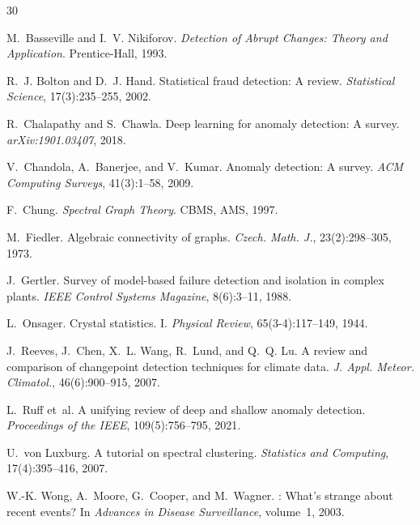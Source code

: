 \documentclass[11pt,a4paper]{article}
\begin{document}

\begin{thebibliography}{30}

M.~Basseville and I.~V. Nikiforov.
\newblock \emph{Detection of Abrupt Changes: Theory and Application}.
\newblock Prentice-Hall, 1993.

R.~J. Bolton and D.~J. Hand.
\newblock Statistical fraud detection: A review.
\newblock \emph{Statistical Science}, 17(3):235--255, 2002.

R.~Chalapathy and S.~Chawla.
\newblock Deep learning for anomaly detection: A survey.
\newblock \emph{arXiv:1901.03407}, 2018.

V.~Chandola, A.~Banerjee, and V.~Kumar.
\newblock Anomaly detection: A survey.
\newblock \emph{ACM Computing Surveys}, 41(3):1--58, 2009.

F.~Chung.
\newblock \emph{Spectral Graph Theory}.
\newblock CBMS, AMS, 1997.

M.~Fiedler.
\newblock Algebraic connectivity of graphs.
\newblock \emph{Czech. Math. J.}, 23(2):298--305, 1973.

J.~Gertler.
\newblock Survey of model-based failure detection and isolation in complex plants.
\newblock \emph{IEEE Control Systems Magazine}, 8(6):3--11, 1988.

L.~Onsager.
\newblock Crystal statistics. {I}.
\newblock \emph{Physical Review}, 65(3-4):117--149, 1944.

J.~Reeves, J.~Chen, X.~L. Wang, R.~Lund, and Q.~Q. Lu.
\newblock A review and comparison of changepoint detection techniques for climate data.
\newblock \emph{J. Appl. Meteor. Climatol.}, 46(6):900--915, 2007.

L.~Ruff et~al.
\newblock A unifying review of deep and shallow anomaly detection.
\newblock \emph{Proceedings of the IEEE}, 109(5):756--795, 2021.

U.~von Luxburg.
\newblock A tutorial on spectral clustering.
\newblock \emph{Statistics and Computing}, 17(4):395--416, 2007.

W.-K. Wong, A.~Moore, G.~Cooper, and M.~Wagner.
: What's strange about recent events?
\newblock In \emph{Advances in Disease Surveillance}, volume~1, 2003.

\end{thebibliography}
\end{document}
